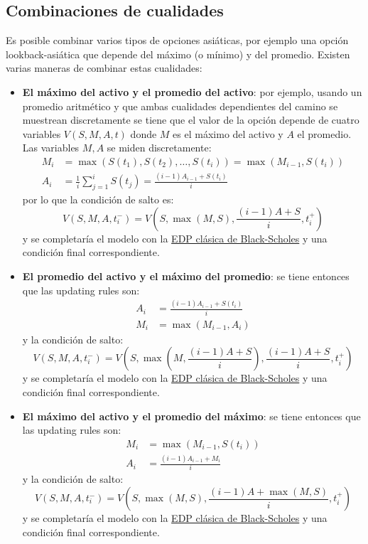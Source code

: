 \subsection{Combinaciones de cualidades}
Es posible combinar varios tipos de opciones asiáticas, por ejemplo una opción lookback-asiática que depende del máximo (o mínimo) y del promedio. Existen varias maneras de combinar estas cualidades:
\begin{itemize}
    \item \textbf{El máximo del activo y el promedio del activo}: por ejemplo, usando un promedio aritmético y que ambas cualidades dependientes del camino se muestrean discretamente se tiene que el valor de la opción depende de cuatro variables $V(S, M, A, t)$ donde $M$ es el máximo del activo y $A$ el promedio. Las variables $M, A$ se miden discretamente:
    \begin{align*}
        M_i &= \max(S(t_1), S(t_2), \ldots, S(t_i)) = \max(M_{i-1}, S(t_i)) \\
        A_i &= \frac{1}{i} \sum_{j=1}^i S(t_j) = \frac{(i-1)A_{i-1} + S(t_i)}{i}
    \end{align*}
    por lo que la condición de salto es:
    \begin{equation*}
        \boxed{V(S, M, A, t_i^-) = V\left(S, \max(M, S), \frac{(i-1)A + S}{i}, t_i^+\right)}
    \end{equation*}
    y se completaría el modelo con la \underline{EDP clásica de Black-Scholes} y una condición final correspondiente.
    
    \item \textbf{El promedio del activo y el máximo del promedio}: se tiene entonces que las updating rules son:
    \begin{align*}
        A_i &= \frac{(i-1)A_{i-1} + S(t_i)}{i} \\
        M_i &= \max(M_{i-1}, A_i)
    \end{align*}
    y la condición de salto:
    \begin{equation*}
        \boxed{
            V(S, M, A, t_i^-) = V\left(S, \max\left(M, \frac{(i-1)A + S}{i}\right), \frac{(i-1)A + S}{i}, t_i^+\right)
        }
    \end{equation*}
    y se completaría el modelo con la \underline{EDP clásica de Black-Scholes} y una condición final correspondiente.

    \item \textbf{El máximo del activo y el promedio del máximo}: se tiene entonces que las updating rules son:
    \begin{align*}
        M_i &= \max(M_{i-1}, S(t_i)) \\
        A_i &= \frac{(i-1)A_{i-1} + M_i}{i}
    \end{align*}
    y la condición de salto:
    \begin{equation*}
        \boxed{
            V(S, M, A, t_i^-) = V\left(S, \max(M, S), \frac{(i-1)A + \max(M, S)}{i}, t_i^+\right)
        }
    \end{equation*}
    y se completaría el modelo con la \underline{EDP clásica de Black-Scholes} y una condición final correspondiente.
\end{itemize}

